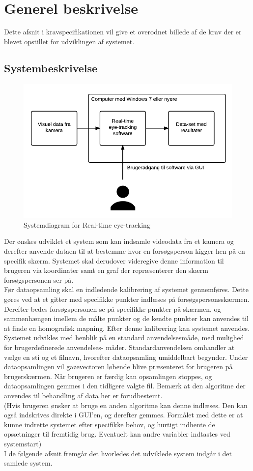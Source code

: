 \documentclass[kravspec.tex]{subfiles}
\begin{document}
\section{Generel beskrivelse}
Dette afsnit i kravspecifikationen vil give et overodnet billede af de krav der er blevet opstillet for udviklingen af systemet.
	
\subsection{Systembeskrivelse}
\begin{figure}[h]
\centering
\includegraphics[width=0.7\linewidth]{Systemdiagram}
\caption[Systemdiagram]{Systemdiagram for Real-time eye-tracking}
\label{fig:Systemdiagram}
\end{figure}
Der ønskes udviklet et system som kan indsamle videodata fra et kamera og derefter anvende dataen til
at bestemme hvor en forsøgsperson kigger hen på en specifik skærm. Systemet skal derudover videregive
denne information til brugeren via koordinater samt en graf der repræsenterer den skærm forsøgspersonen
ser på.
\\
Før dataopsamling skal en indledende kalibrering af systemet gennemføres. Dette gøres ved at et gitter med
specifikke punkter indlæses på forsøgspersonsskærmen. Derefter bedes forsøgspersonen se på specifikke punkter
på skærmen, og sammenhængen imellem de målte punkter og de kendte punkter kan anvendes til at finde en
homografisk mapning. Efter denne kalibrering kan systemet anvendes.
\\
Systemet udvikles med henblik på en standard anvendelsesmåde, med mulighed for brugerdefinerede anvendelses-
måder. Standardanvendelsen omhandler at vælge en sti og et filnavn, hvorefter dataopsamling umiddelbart begynder.
Under dataopsamlingen vil gazevectoren løbende blive præsenteret for brugeren på brugerskærmen. Når brugeren er 
færdig kan opsamlingen stoppes, og dataopsamlingen gemmes i den tidligere valgte fil. Bemærk at den algoritme
der anvendes til behandling af data her er forudbestemt.
\\
(Hvis brugeren ønsker at bruge en anden algoritme kan denne indlæses. Den kan også indskrives direkte i
GUI'en, og derefter gemmes. Formålet med dette er at kunne indrette systemet efter specifikke behov, og
hurtigt indhente de opsætninger til fremtidig brug. Eventuelt kan andre variabler indtastes ved systemstart) 
\\
I de følgende afsnit fremgår det hvorledes det udviklede system indgår i det samlede system.
\end{document}
